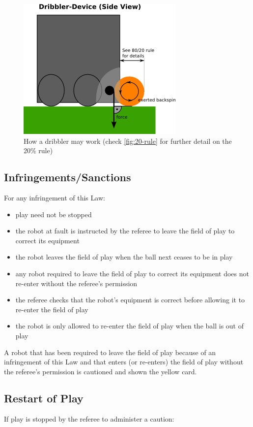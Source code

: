 \begin{figure}[ht]
	\centering
	\includegraphics[width=0.5\columnwidth]{img/dribblers_1.png}
	\caption{How a dribbler may work (check \autoref{fig:20-rule} for further detail on the 20\% rule)}
	\label{fig:dribblers}
\end{figure}

\subsection{Infringements/Sanctions}
For any infringement of this Law:

\begin{itemize}
\item play need not be stopped
\item the robot at fault is instructed by the referee to leave the field of play to correct its equipment
\item the robot leaves the field of play when the ball next ceases to be in play
\item any robot required to leave the field of play to correct its equipment does not re-enter without the referee's permission
\item the referee checks that the robot's equipment is correct before allowing it to re-enter the field of play
\item the robot is only allowed to re-enter the field of play when the ball is out of play
\end{itemize}

A robot that has been required to leave the field of play because of an infringement of this Law and that enters (or re-enters) the field of play without the referee's permission is cautioned and shown the yellow card.

\subsection{Restart of Play}
If play is stopped by the referee to administer a caution:

